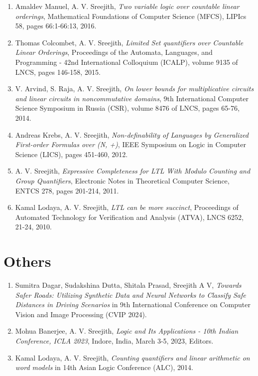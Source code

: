 \documentclass[11pt,a4paper,sans]{moderncv} %
\begin{document}
\begin{enumerate}
\item Amaldev Manuel, A. V. Sreejith, \emph{Two variable logic over countable linear orderings}, Mathematical Foundations of Computer Science (MFCS), LIPIcs 58, pages 66:1-66:13, 2016.
\item Thomas Colcombet, A. V. Sreejith, \emph{Limited Set quantifiers over Countable Linear Orderings}, Proceedings of the Automata, Languages, and Programming - 42nd International Colloquium (ICALP), volume 9135 of LNCS, pages 146-158, 2015.
\item V. Arvind, S. Raja, A. V. Sreejith, \emph{On lower bounds for multiplicative circuits and linear circuits in noncommutative domains}, 9th International Computer Science Symposium in Russia (CSR), volume 8476 of LNCS, pages 65-76, 2014.
\item Andreas Krebs, A. V. Sreejith, \emph{Non-definability of Languages by Generalized First-order Formulas over (N, +)}, IEEE Symposium on Logic in Computer Science (LICS),  pages 451-460, 2012.
\item A. V. Sreejith, \emph{Expressive Completeness for LTL With Modulo Counting and Group Quantifiers}, Electronic Notes in Theoretical Computer Science, ENTCS 278, pages 201-214, 2011.
\item Kamal Lodaya, A. V. Sreejith, \emph{LTL can be more succinct}, Proceedings of Automated Technology for Verification and Analysis (ATVA), LNCS 6252, 21-24, 2010.
\end{enumerate}

\section{Others}
\begin{enumerate}
\item Sumitra Dagar, Sudakshina Dutta, Shitala Prasad, Sreejith A V, \emph{Towards Safer Roads: Utilizing Synthetic Data and Neural Networks to Classify Safe Distances in Driving Scenarios} in 9th International Conference on Computer Vision and Image Processing (CVIP 2024).
\item Mohua Banerjee, A. V. Sreejith, \emph{Logic and Its Applications - 10th Indian Conference, ICLA 2023}, Indore, India, March 3-5, 2023, Editors.
\item Kamal Lodaya, A. V. Sreejith, \emph{Counting quantifiers and linear arithmetic on word models} in 14th Asian Logic Conference (ALC), 2014.
\end{enumerate}
\else
\end{document}
